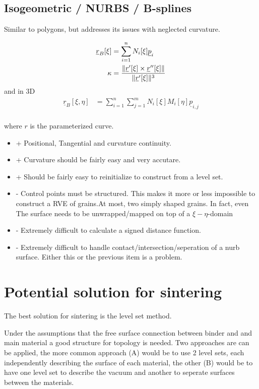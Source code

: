 \documentclass[a4paper,10pt]{article}
\DeclarePairedDelimiter\norm{\lVert}{\rVert}
\newcommand*\uv[1]{\underline{#1}}
\begin{document}
\subsection{Isogeometric / NURBS / B-splines}
Similar to polygons, but addresses its issues with neglected curvature.

\begin{align}
    \uv{r}_B[\xi] &= \sum_{i=1}^n N_i[\xi]\uv{p}_i\\
    \kappa &= \frac{\norm{\uv{r}'[\xi] \times \uv{r}''[\xi]}}{\norm{\uv{r}'[\xi]}^3}
\end{align}
and in 3D
\begin{align}
   \uv{r}_B[\xi,\eta] &= \sum_{i=1}^n \sum_{j=1}^m N_i[\xi] M_i[\eta] \uv{p}_{i,j}\\
\end{align}

where $r$ is the parameterized curve.

\begin{itemize}
\item + Positional, Tangential and curvature continuity.
\item + Curvature should be fairly easy and very accutare.
\item + Should be fairly easy to reinitialize to construct from a level set.
\item - Control points must be structured. This makes it more or less impossible to construct a RVE of grains.At most, two simply shaped grains. In fact, even 
		 The surface needs to be unwrapped/mapped on top of a $\xi-\eta$-domain
\item - Extremely difficult to calculate a signed distance function.
\item - Extremely difficult to handle contact/intersection/seperation of a nurb surface.
        Either this or the previous item is a problem.
\end{itemize}

\section{Potential solution for sintering}
The best solution for sintering is the level set method.

Under the assumptions that the free surface connection between binder and and main material a good structure for topology is needed. 
Two approaches are can be applied, the more common approach (A) would be to use 2 level sets, each independently describing the surface of each material, the other (B) would be to have one level set to describe the vacuum and another to seperate surfaces between the materials.
\end{document}
